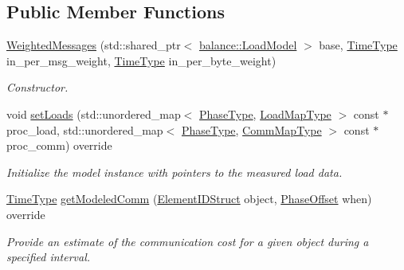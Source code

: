 \subsection*{Public Member Functions}
\begin{DoxyCompactItemize}
\item 
\hyperlink{structvt_1_1vrt_1_1collection_1_1balance_1_1_weighted_messages_ac5151d922cbb092e9bea5ccdbf4ff980}{Weighted\+Messages} (std\+::shared\+\_\+ptr$<$ \hyperlink{structvt_1_1vrt_1_1collection_1_1balance_1_1_load_model}{balance\+::\+Load\+Model} $>$ base, \hyperlink{namespacevt_a876a9d0cd5a952859c72de8a46881442}{Time\+Type} in\+\_\+per\+\_\+msg\+\_\+weight, \hyperlink{namespacevt_a876a9d0cd5a952859c72de8a46881442}{Time\+Type} in\+\_\+per\+\_\+byte\+\_\+weight)
\begin{DoxyCompactList}\small\item\em Constructor. \end{DoxyCompactList}\item 
void \hyperlink{structvt_1_1vrt_1_1collection_1_1balance_1_1_weighted_messages_ad0e6b88668ac59f4fb376a2dba81e593}{set\+Loads} (std\+::unordered\+\_\+map$<$ \hyperlink{namespacevt_a46ce6733d5cdbd735d561b7b4029f6d7}{Phase\+Type}, \hyperlink{namespacevt_1_1vrt_1_1collection_1_1balance_a5339303db2e1ce964d783a53fd74e6b1}{Load\+Map\+Type} $>$ const $\ast$proc\+\_\+load, std\+::unordered\+\_\+map$<$ \hyperlink{namespacevt_a46ce6733d5cdbd735d561b7b4029f6d7}{Phase\+Type}, \hyperlink{namespacevt_1_1vrt_1_1collection_1_1balance_a01ee1fb0ae2da1d2ab7fdca3be9ae351}{Comm\+Map\+Type} $>$ const $\ast$proc\+\_\+comm) override
\begin{DoxyCompactList}\small\item\em Initialize the model instance with pointers to the measured load data. \end{DoxyCompactList}\item 
\hyperlink{namespacevt_a876a9d0cd5a952859c72de8a46881442}{Time\+Type} \hyperlink{structvt_1_1vrt_1_1collection_1_1balance_1_1_weighted_messages_a82f309e4cc3cb193f571b55b5170c760}{get\+Modeled\+Comm} (\hyperlink{namespacevt_1_1vrt_1_1collection_1_1balance_a9f5b53fafb270212279a4757d2c4cd28}{Element\+I\+D\+Struct} object, \hyperlink{structvt_1_1vrt_1_1collection_1_1balance_1_1_phase_offset}{Phase\+Offset} when) override
\begin{DoxyCompactList}\small\item\em Provide an estimate of the communication cost for a given object during a specified interval. \end{DoxyCompactList}\end{DoxyCompactItemize}
